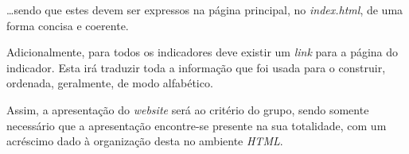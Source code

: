 \dots sendo que estes devem ser expressos na página principal, no \textit{index.html}, de uma forma concisa e coerente.

Adicionalmente, para todos os indicadores deve existir um \textit{link} para a página do indicador. 
Esta irá traduzir toda a informação que foi usada para o construir, ordenada, geralmente, de modo alfabético.

Assim, a apresentação do \textit{website} será ao critério do grupo, sendo somente necessário que a apresentação 
encontre-se presente na sua totalidade, com um acréscimo dado à organização desta no ambiente \textit{HTML}.
